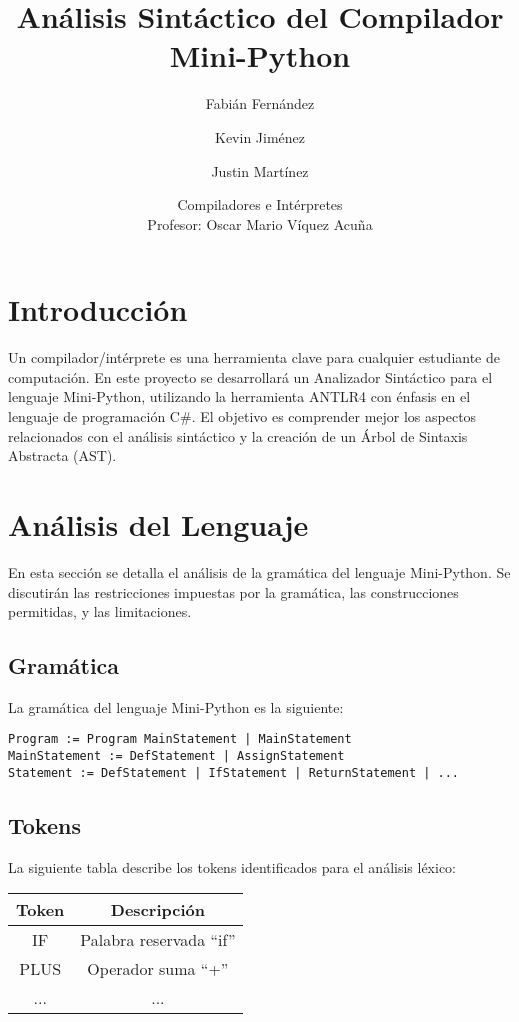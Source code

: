 \documentclass{article}
\title{Análisis Sintáctico del Compilador Mini-Python}
\author{
    Fabián Fernández \and Kevin Jiménez \and Justin Martínez
}
\date{Compiladores e Intérpretes\\ Profesor: Oscar Mario Víquez Acuña}
\begin{document}
\maketitle
\newpage

\tableofcontents
\newpage

\section{Introducción}
Un compilador/intérprete es una herramienta clave para cualquier estudiante de computación. En este proyecto se desarrollará un Analizador Sintáctico para el lenguaje Mini-Python, utilizando la herramienta ANTLR4 con énfasis en el lenguaje de programación C\#. El objetivo es comprender mejor los aspectos relacionados con el análisis sintáctico y la creación de un Árbol de Sintaxis Abstracta (AST).

\section{Análisis del Lenguaje}
En esta sección se detalla el análisis de la gramática del lenguaje Mini-Python. Se discutirán las restricciones impuestas por la gramática, las construcciones permitidas, y las limitaciones.

\subsection{Gramática}
La gramática del lenguaje Mini-Python es la siguiente:
\begin{verbatim}
Program := Program MainStatement | MainStatement   
MainStatement := DefStatement | AssignStatement  
Statement := DefStatement | IfStatement | ReturnStatement | ...
\end{verbatim}

\subsection{Tokens}
La siguiente tabla describe los tokens identificados para el análisis léxico:
\begin{center}
    \begin{tabular}{|c|c|}
        \hline
        Token & Descripción \\
        \hline
        IF & Palabra reservada ``if'' \\
        PLUS & Operador suma ``+'' \\
        ... & ... \\
        \hline
    \end{tabular}
\end{center}
\end{document}
